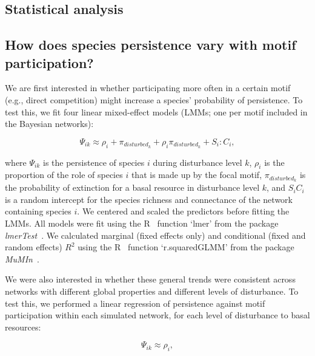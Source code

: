 \documentclass[12pt]{article}
\begin{document}
\begin{spacing}{2.0}
\section{Statistical analysis}

    \subsection{How does species persistence vary with motif participation?}

        We are first interested in whether participating more often in a certain motif (e.g., direct competition) might increase a species' probability of persistence.
        To test this, we fit four linear mixed-effect models (LMMs; one per motif included in the Bayesian networks):

        \begin{equation}
            \Psi_{ik} \approx \rho_{i} + \pi_{disturbed_k} + \rho_{i}\pi_{disturbed_k} +
            S_{i}:C_{i} ,
            \label{propreq}
        \end{equation}


        \noindent where $\Psi_{ik}$ is the persistence of species $i$ during disturbance level $k$, $\rho_{i}$ is the proportion of the role of species $i$ that is made up by the focal motif, $\pi_{disturbed_k}$ is the probability of extinction for a basal resource in disturbance level $k$, and $S_{i}C_{i}$ is a random intercept for the species richness and connectance of the network containing species $i$.
        We centered and scaled the predictors before fitting the LMMs.
        All models were fit using the R~\citep{R} function `lmer' from the package \emph{lmerTest}~\citep{lmerTest}.
        We calculated marginal (fixed effects only) and conditional (fixed and random effects) $R^2$ using the R~\citep{R} function `r.squaredGLMM' from the package \emph{MuMIn}~\citep{MuMIn}.

        
        We were also interested in whether these general trends were consistent across networks with different global properties and different levels of disturbance. 
        To test this, we performed a linear regression of persistence against motif participation within each simulated network, for each level of disturbance to basal resources:

        \begin{equation}
            \Psi_{ik} \approx \rho_{i} ,
            \label{mineq}
        \end{equation}


\end{spacing}
\end{document}
